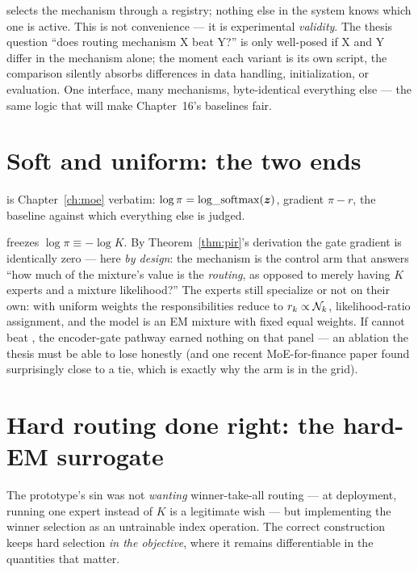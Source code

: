 \begin{engineering}
selects the mechanism through a registry; nothing else in the system
knows which one is active. This is not convenience --- it is experimental
\emph{validity}. The thesis question ``does routing mechanism X beat Y?''
is only well-posed if X and Y differ in the mechanism alone; the moment
each variant is its own script, the comparison silently absorbs
differences in data handling, initialization, or evaluation. One
interface, many mechanisms, byte-identical everything else --- the same
logic that will make Chapter~16's baselines fair.
\end{engineering}

\section{Soft and uniform: the two ends}\label{sec:softuniform}

 is Chapter~\ref{ch:moe} verbatim: $\log \pi =
\operatorname{log\_softmax}(\bm{z})$, gradient $\pi - r$, the baseline
against which everything else is judged.

 freezes $\log \pi \equiv -\log K$. By
Theorem~\ref{thm:pir}'s derivation the gate gradient is identically zero
--- here \emph{by design}: the mechanism is the control arm that answers
``how much of the mixture's value is the \emph{routing}, as opposed to
merely having $K$ experts and a mixture likelihood?'' The experts still
specialize or not on their own: with uniform weights the responsibilities
reduce to $r_k \propto \mathcal{N}_k$, likelihood-ratio assignment, and the
model is an EM mixture with fixed equal weights. If  cannot
beat , the encoder-gate pathway earned nothing on that
panel --- an ablation the thesis must be able to lose honestly
(and one recent MoE-for-finance paper found surprisingly close to a tie,
which is exactly why the arm is in the grid).

\section{Hard routing done right: the hard-EM surrogate}
\label{sec:hardem}

The prototype's sin was not \emph{wanting} winner-take-all routing --- at
deployment, running one expert instead of $K$ is a legitimate wish --- but
implementing the winner selection as an untrainable index operation. The
correct construction keeps hard selection \emph{in the objective}, where
it remains differentiable in the quantities that matter.

